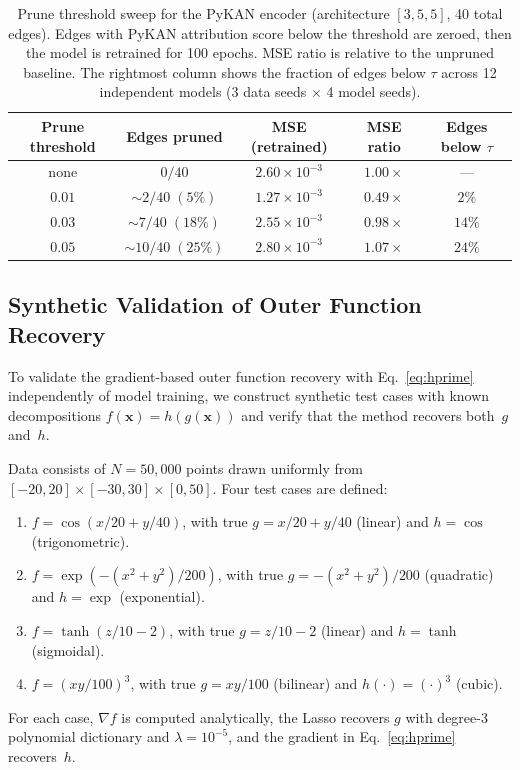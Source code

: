 \documentclass{article}
\newcommand{\x}{\bm{x}}
\begin{document}
\begin{table}[ht]
\centering
\begin{tabular}{@{}ccccc@{}}
\toprule
Prune threshold & Edges pruned & MSE (retrained) & MSE ratio & Edges below $\tau$ \\
\midrule
none & $0/40$ & $2.60 \times 10^{-3}$ & $1.00\times$ & --- \\
$0.01$ & $\sim\!2/40\;(5\%)$ & $1.27 \times 10^{-3}$ & $0.49\times$ & $2\%$ \\
$0.03$ & $\sim\!7/40\;(18\%)$ & $2.55 \times 10^{-3}$ & $0.98\times$ & $14\%$ \\
$0.05$ & $\sim\!10/40\;(25\%)$ & $2.80 \times 10^{-3}$ & $1.07\times$ & $24\%$ \\
\bottomrule
\end{tabular}
\caption{Prune threshold sweep for the PyKAN encoder (architecture $[3,5,5]$, 40 total edges). Edges with PyKAN attribution score below the threshold are zeroed, then the model is retrained for 100 epochs. MSE ratio is relative to the unpruned baseline. The rightmost column shows the fraction of edges below $\tau$ across 12 independent models (3 data seeds $\times$ 4 model seeds).}
\label{tab:prune-sweep}
\end{table}
  
\subsection{Synthetic Validation of Outer Function Recovery}
\label{sec:synthetic}

To validate the gradient-based outer function recovery with Eq.~\eqref{eq:hprime} independently of model training, we construct synthetic test cases with known decompositions $f(\x) = h(g(\x))$ and verify that the method recovers both~$g$ and~$h$.

Data consists of $N = 50{,}000$ points drawn uniformly from
$[-20,20] \times [-30,30] \times [0,50]$.
Four test cases are defined:
\begin{enumerate}
\item $f = \cos(x/20 + y/40)$, with true $g = x/20 + y/40$ (linear)
  and $h = \cos$ (trigonometric).
\item $f = \exp(-(x^2 + y^2)/200)$, with true
  $g = -(x^2+y^2)/200$ (quadratic) and $h = \exp$ (exponential).
\item $f = \tanh(z/10 - 2)$, with true $g = z/10 - 2$ (linear)
  and $h = \tanh$ (sigmoidal).
\item $f = (xy/100)^3$, with true $g = xy/100$ (bilinear)
  and $h(\cdot) = (\cdot)^3$ (cubic).
\end{enumerate}
For each case, $\nabla f$ is computed analytically, the Lasso recovers $g$ with degree-3 polynomial dictionary and $\lambda = 10^{-5}$, and the gradient in Eq.~\eqref{eq:hprime} recovers~$h$.
\end{document}
